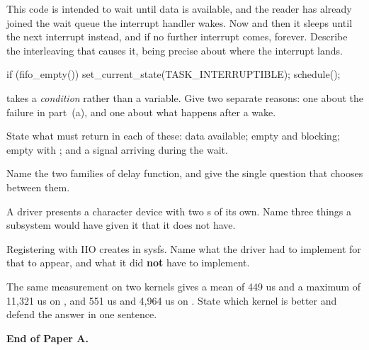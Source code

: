 This code is intended to wait until data is available, and the reader has already
joined the wait queue the interrupt handler wakes. Now and then it sleeps until the next interrupt
instead, and if no further interrupt comes, forever. Describe the interleaving that causes it,
being precise about where the interrupt lands. 

\begin{ccode}
if (fifo_empty()) {
        set_current_state(TASK_INTERRUPTIBLE);
        schedule();
}
\end{ccode}

  takes a \emph{condition} rather than a variable. Give two
separate reasons: one about the failure in part~(a), and one about what happens after a wake. 

 State what  must return in each of these: data available; empty and blocking;
empty with ; and a signal arriving during the wait. 

 Name the two families of delay function, and give the single question that chooses between
them. 

\label{exa:q:10}

 A driver presents a character device with two s of its own. Name three things
a subsystem would have given it that it does not have. 

 Registering with IIO creates  in sysfs. Name what the driver had to
implement for that to appear, and what it did \textbf{not} have to implement. 

 The same measurement on two kernels gives a mean of 449 us and a maximum of 11,321 us on
, and 551 us and 4,964 us on . State which kernel is better and
defend the answer in one sentence. 

\textbf{End of Paper A.}
